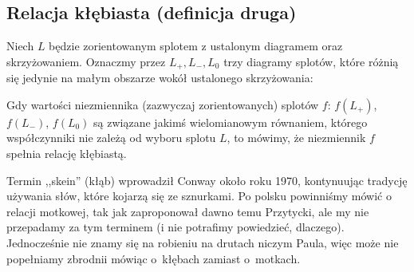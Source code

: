 
\subsection{Relacja kłębiasta (definicja druga)}

\begin{definition}
\label{skein_symbols}%
%
    Niech $L$ będzie zorientowanym splotem z ustalonym diagramem oraz skrzyżowaniem.
    Oznaczmy przez $L_+, L_-, L_0$ trzy diagramy splotów, które różnią się jedynie na małym obszarze wokół ustalonego skrzyżowania:
\begin{comment}
    \begin{figure}[H]
        \centering
        \begin{minipage}[b]{.3\linewidth}
            \centering
            \[\LargePlusCrossingArrows\]
            \subcaption{$L_+$}
        \end{minipage}
        \begin{minipage}[b]{.3\linewidth}
            \centering
            \[\LargeMinusCrossingArrows\]
            \subcaption{$L_-$}
        \end{minipage}
        \begin{minipage}[b]{.3\linewidth}
            \centering
            \[\LargeJustSmoothing\]
            \subcaption{$L_0$}
        \end{minipage}
    \end{figure}
\end{comment}
\noindent
Gdy wartości niezmiennika (zazwyczaj zorientowanych) splotów $f$: $f(L_+)$, $f(L_-)$, $f(L_0)$ są związane jakimś wielomianowym równaniem, którego współczynniki nie zależą od wyboru splotu $L$, to mówimy, że niezmiennik $f$ spełnia relację kłębiastą.
\end{definition}

Termin ,,skein'' (kłąb) wprowadził Conway około roku 1970, kontynuując tradycję używania słów, które kojarzą się ze sznurkami.
%
Po polsku powinniśmy mówić o relacji motkowej, tak jak zaproponował dawno temu Przytycki, ale my nie przepadamy za tym terminem (i nie potrafimy powiedzieć, dlaczego).
Jednocześnie nie znamy się na robieniu na drutach niczym Paula, więc może nie popełniamy zbrodnii mówiąc o~kłębach zamiast o~motkach.

